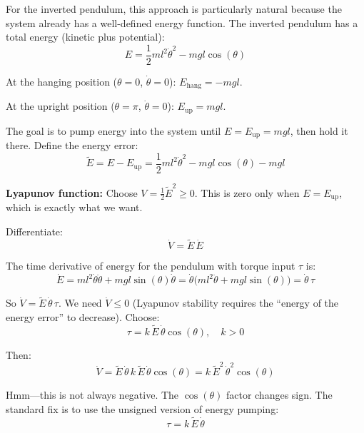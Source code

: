 For the inverted pendulum, this approach is particularly natural because the system already has a well-defined energy function. The inverted pendulum has a total energy (kinetic plus potential):
\begin{equation}
E = \frac{1}{2}ml^2\dot{\theta}^2 - mgl\cos(\theta)
\end{equation}

At the hanging position ($\theta = 0$, $\dot{\theta} = 0$): $E_{\text{hang}} = -mgl$.

At the upright position ($\theta = \pi$, $\dot{\theta} = 0$): $E_{\text{up}} = mgl$.

The goal is to pump energy into the system until $E = E_{\text{up}} = mgl$, then hold it there. Define the energy error:
\begin{equation}
\tilde{E} = E - E_{\text{up}} = \frac{1}{2}ml^2\dot{\theta}^2 - mgl\cos(\theta) - mgl
\end{equation}

\textbf{Lyapunov function:} Choose $V = \frac{1}{2}\tilde{E}^2 \geq 0$. This is zero only when $E = E_{\text{up}}$, which is exactly what we want.

Differentiate:
\begin{equation}
\dot{V} = \tilde{E}\,\dot{E}
\end{equation}

The time derivative of energy for the pendulum with torque input $\tau$ is:
\begin{equation}
\dot{E} = ml^2\dot{\theta}\ddot{\theta} + mgl\sin(\theta)\dot{\theta} = \dot{\theta}\bigl(ml^2\ddot{\theta} + mgl\sin(\theta)\bigr) = \dot{\theta}\,\tau
\end{equation}

So $\dot{V} = \tilde{E}\,\dot{\theta}\,\tau$. We need $\dot{V} \leq 0$ (Lyapunov stability requires the ``energy of the energy error'' to decrease). Choose:
\begin{equation}
\tau = k\,\tilde{E}\,\dot{\theta}\cos(\theta), \quad k > 0
\end{equation}

Then:
\begin{equation}
\dot{V} = \tilde{E}\,\dot{\theta}\,k\,\tilde{E}\,\dot{\theta}\cos(\theta) = k\,\tilde{E}^2\,\dot{\theta}^2\cos(\theta)
\end{equation}

Hmm---this is not always negative. The $\cos(\theta)$ factor changes sign. The standard fix is to use the unsigned version of energy pumping:
\begin{equation}
\tau = k\,\tilde{E}\,\dot{\theta}
\end{equation}

